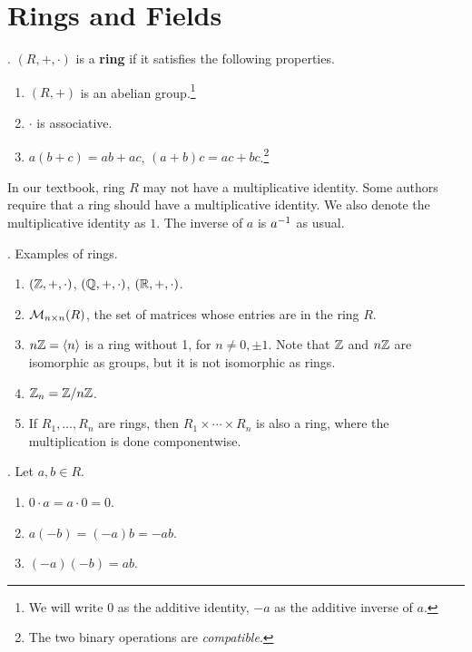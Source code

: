\setcounter{chapter}{3}
\chapter{Rings and Fields}

\setcounter{topic}{17}

.  \((R, +, \cdot)\) is a \textbf{ring} if it satisfies the following properties.
\begin{enumerate}
    \item \((R, +)\) is an abelian group.\footnote{We will write 0 as the additive identity, \(-a\) as the additive inverse of \(a\).}
    \item \(\cdot\) is associative.
    \item {} \(a (b + c) = ab + ac\), \((a + b) c = ac + bc\).\footnote{The two binary operations are \textit{compatible}.}
\end{enumerate}

\rmk In our textbook, ring \(R\) may not have a multiplicative identity. Some authors require that a ring should have a multiplicative identity. We also denote the multiplicative identity as \(1\). The inverse of \(a\) is \(a^{-1}\) as usual.

\ex. Examples of rings.
\begin{enumerate}
    \item \((\mathbb{Z}, +, \cdot)\), \((\mathbb{Q}, +, \cdot)\), \((\mathbb{R}, +, \cdot)\).
    \item \(\mathcal{M}_{n\times n}(R)\), the set of matrices whose entries are in the ring \(R\).
    \item \(n\mathbb{Z} = \left\langle n \right\rangle\) is a ring without 1, for \(n \neq 0, \pm 1\). Note that \(\mathbb{Z}\) and \(n\mathbb{Z}\) are isomorphic as groups, but it is not isomorphic as rings.
    \item \(\mathbb{Z}_n = \mathbb{Z} / n\mathbb{Z}\).
    \item {} If \(R_1, \dots, R_n\) are rings, then \(R_1 \times \cdots \times R_n\) is also a ring, where the multiplication is done componentwise.
\end{enumerate}

\pagebreak

\thm. Let \(a, b \in R\).
\begin{enumerate}
    \item \(0 \cdot a = a \cdot 0 = 0\).
    \item \(a(-b) = (-a)b = -ab\).
    \item \((-a)(-b) = ab\).
\end{enumerate}

